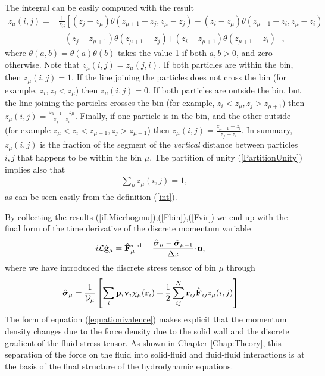 \documentclass[b5paper,openright,10pt]{book}
\newcommand{\esc}{\!\cdot\!}
\begin{document}
The integral can be easily computed with the result
\begin{align}
 z_\mu(i,j)=&\frac{1}{z_{ij}}\left[(z_j-z_\mu) \theta(z_{\mu+1}-z_{j},z_\mu-z_{j} )\right.
-(z_i-z_\mu) \theta(z_{\mu+1}-z_i,z_\mu-z_i)
\nonumber\\
&-(z_{j}-z_{\mu+1}) \theta(z_{\mu+1}-z_{j})
\left.+(z_i-z_{\mu+1}) \theta (z_{\mu+1}-z_i)\right],
\label{geoFactor}
\end{align}
where  $\theta(a,b)=\theta(a)\theta(b)$  takes  the value  1  if  both
$a,b>0$, and  zero otherwise.  Note that  $z_\mu(i,j)=z_\mu(j,i)$.  If
both particles are within the bin,  then $ z_\mu(i,j)=1$.  If the line
joining  the   particles  does  not   cross  the  bin   (for  example,
$z_i,z_j<z_\mu$) then  $z_\mu(i,j)=0$.  If both particles  are outside
the  bin, but  the line  joining the  particles crosses  the bin  (for
example,                $z_i<z_\mu,z_j>z_{\mu+1}$)                then
$z_\mu(i,j)=\frac{z_{\mu+1}-z_\mu}{z_j-z_i}$. Finally, if one particle
is   in    the   bin,   and    the   other   outside    (for   example
$z_\mu<z_i<z_{\mu+1},               z_j>z_{\mu+1}$)               then
$z_\mu(i,j)=\frac{z_{\mu+1}-z_i}{z_j-z_i}$.  In  summary, $z_\mu(i,j)$
is  the fraction  of  the segment  of  the \textit{vertical}  distance
between particles $i,j$ that happens to  be within the bin $\mu$. 
The  partition  of unity  (\ref{PartitionUnity})
implies also that
\begin{align}
  \sum_\mu z_{\mu}(i,j) =1,
\label{zmu1}
\end{align}
as can be seen easily from the definition (\ref{int}).

By                collecting                the                results
(\ref{iLMicrhogmu}),(\ref{Fbin}),(\ref{Fvir}) we end  up
with the final form of the time derivative of the discrete momentum variable
\begin{align}
  i{\cal L}\hat{\bf g}_\mu &=\hat{\bf F}_\mu^{\rm s\to l}-\frac{\hat{\boldsymbol{\sigma}}_\mu-\hat{\boldsymbol{\sigma}}_{\mu-1}}{\Delta z}\esc{\bf n},
\label{equationivalence}
\end{align}
where we have introduced the discrete stress tensor of bin $\mu$ through
\begin{align}
 \hat{ \boldsymbol{\sigma}}_{\mu}
&=
\frac{1}{{\cal V}_\mu} \left[\sum_i{\bf p}_i{\bf v}_i\chi_\mu({\bf r}_i)
+\frac{1}{2}\sum^{N}_{ij}{\bf r}_{ij}\hat{\bf F}_{ij}z_\mu(i,j)\right]
\label{sbin}
\end{align}
The form of  equation (\ref{equationivalence}) makes explicit  that the momentum
density changes due to the force density due to the solid wall and the
discrete gradient of  the fluid stress tensor. As shown in Chapter \ref{Chap:Theory}, this  separation of the
force on the fluid into  solid-fluid and fluid-fluid interactions is at
the basis of the final structure of the hydrodynamic equations.
\end{document}
